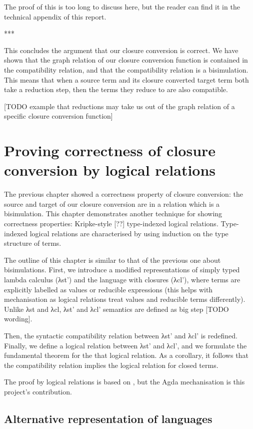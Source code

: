 \documentclass[bsc,frontabs,oneside,singlespacing,parskip,deptreport]{infthesis}
\theoremstyle{definition}
\theoremstyle{lemma}
\begin{document}
The proof of this is too long to discuss here, but the reader can find
it in the technical appendix of this report.

***

This concludes the argument that our closure conversion is correct. We
have shown that the graph relation of our closure conversion function
is contained in the compatibility relation, and that the compatibility
relation is a bisimulation. This means that when a source term and its
closure converted target term both take a reduction step, then the
terms they reduce to are also compatible.

[TODO example that reductions may take us out of the graph relation of
a specific closure conversion function]

\chapter{Proving correctness of closure conversion by logical
  relations}
\label{cha:proof-logic-relat}

The previous chapter showed a correctness property of closure
conversion: the source and target of our closure conversion are in a
relation which is a bisimulation. This chapter demonstrates another
technique for showing correctness properties: Kripke-style [??]
type-indexed logical relations. Type-indexed logical relations are
characterised by using induction on the type structure of terms.

The outline of this chapter is similar to that of the previous one
about bisimulations. First, we introduce a modified representations of
simply typed lambda calculus (λst') and the language with closures
(λcl'), where terms are explicitly labelled as values or reducible
expressions (this helps with mechanisation as logical relations treat
values and reducible terms differently). Unlike λst and λcl, λst' and
λcl' semantics are defined as big step [TODO wording].

Then, the syntactic compatibility relation between λst' and λcl' is
redefined. Finally, we define a logical relation between λst' and
λcl', and we formulate the fundamental theorem for the that logical
relation. As a corollary, it follows that the compatibility relation
implies the logical relation for closed terms.

The proof by logical relations is based on
\cite{DBLP:conf/popl/MinamideMH96}, but the Agda mechanisation is this
project's contribution.

\section{Alternative representation of languages}
\label{sec:altern-form-interm}
\end{document}
